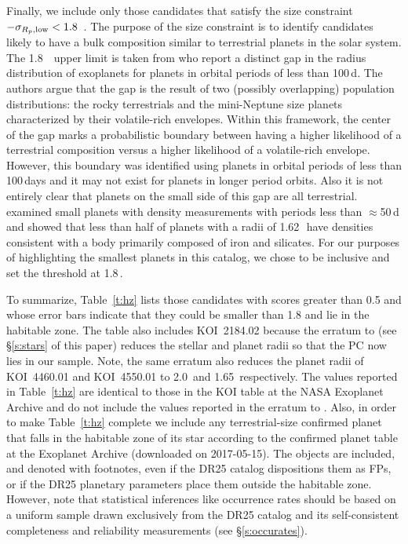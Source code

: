 Finally, we include only those candidates that satisfy the size constraint \rp~$- \sigma_{{R_p}\rm,low} < 1.8$~\re.  The purpose of the size constraint is to identify candidates likely to have a bulk composition similar to terrestrial planets in the solar system.  The 1.8~\re\ upper limit is taken from \citet{Fulton2017} who report a distinct gap in the radius distribution of exoplanets for planets in orbital periods of less than 100\,d.  The authors argue that the gap is the result of two (possibly overlapping) population distributions: the rocky terrestrials and the mini-Neptune size planets characterized by their volatile-rich envelopes.  Within this framework, the center of the gap marks a probabilistic boundary between having a higher likelihood of a terrestrial composition versus a higher likelihood of a volatile-rich envelope.  However, this boundary was identified using planets in orbital periods of less than 100\,days and it may not exist for planets in longer period orbits. Also it is not entirely clear that planets on the small side of this gap are all terrestrial. \citet{Rogers2015} examined small planets with density measurements with periods less than $\approx$50\,d and showed that less than half of planets with a radii of 1.62\,\re\ have densities consistent with a body primarily composed of iron and silicates.  For our purposes of highlighting the smallest planets in this catalog, we chose to be inclusive and set the threshold at 1.8\,\re.


To summarize, Table~\ref{t:hz} lists those candidates with scores greater than 0.5 and whose error bars indicate that they could be smaller than 1.8 \re{} and lie in the habitable zone. The table also includes KOI~2184.02 because the erratum to \citet{Mathur2017ApJS} (see \S\ref{s:stars} of this paper) reduces the stellar and planet radii so that the PC now lies in our sample. Note, the same erratum also reduces the planet radii of KOI~4460.01 and KOI~4550.01 to 2.0\,\re{} and 1.65\,\re{} respectively. The values reported in Table~\ref{t:hz} are identical to those in the KOI table at the NASA Exoplanet Archive and do not include the values reported in the erratum to \citet{Mathur2017ApJS}. Also, in order to make Table~\ref{t:hz} complete we include any \Kepler{} terrestrial-size confirmed planet that falls in the habitable zone of its star according to the confirmed planet table at the Exoplanet Archive (downloaded on 2017-05-15). The objects are included, and denoted with footnotes, even if the DR25 catalog dispositions them as FPs, or if the DR25 planetary parameters place them outside the habitable zone. However, note that statistical inferences like occurrence rates should be based on a uniform sample drawn exclusively from the DR25 catalog and its self-consistent completeness and reliability measurements (see \S\ref{s:occurates}).  


